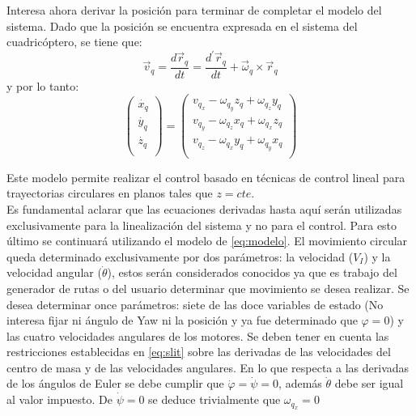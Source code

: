 \documentclass[main]{subfiles}
\begin{document}
Interesa ahora derivar la posici\'on para terminar de completar el modelo del sistema. Dado que la posici\'on se encuentra expresada en el sistema del cuadric\'optero, se tiene que:
\begin{equation}
\vec{v}_q = \frac{d\vec{r}_q}{dt}=\frac{d^\prime\vec{r}_q}{dt}+\vec{\omega}_q \times \vec{r}_q
\end{equation}
y por lo tanto:
\begin{equation}
\label{eq:MVEcirc}
\left(\begin{array}{c}
\dot{x_q}\\
\dot{y_q}\\
\dot{z_q}\\
\end{array}\right)=\left(\begin{array}{c}
v_{q_x}-\omega_{q_y}z_q+\omega_{q_z}y_q\\
v_{q_y}-\omega_{q_z}x_q+\omega_{q_x}z_q\\
v_{q_z}-\omega_{q_x}y_q+\omega_{q_y}x_q\\
\end{array}\right)
\end{equation}

Este modelo permite realizar el control basado en t\'ecnicas de control lineal para trayectorias circulares en planos tales que $z=cte$.\\

Es fundamental aclarar que las ecuaciones derivadas hasta aqu\'i ser\'an utilizadas exclusivamente para la linealizaci\'on del sistema y no para el control. Para esto \'ultimo se continuar\'a utilizando el modelo de \ref{eq:modelo}. El movimiento circular queda determinado exclusivamente por dos par\'ametros: la velocidad ($V_I$) y la velocidad angular ($\dot{\theta}$), estos ser\'an considerados conocidos ya que es trabajo del generador de rutas o del usuario determinar que movimiento se desea realizar. Se desea determinar once par\'ametros: siete de las doce variables de estado (No interesa fijar ni \'angulo de Yaw ni la posici\'on y ya fue determinado que $\varphi = 0$) y las cuatro velocidades angulares de los motores.  Se deben tener en cuenta las restricciones establecidas en \ref{eq:slit} sobre las derivadas de las velocidades del centro de masa y de las velocidades angulares. En lo que respecta a las derivadas de los \'angulos de Euler se debe cumplir que $\dot{\varphi}=\dot{\psi}=0$, adem\'as $\dot{\theta}$ debe ser igual al valor impuesto. De $\dot{\psi} = 0$ se deduce trivialmente que $\omega_{q_x} = 0$ 
\end{document}

